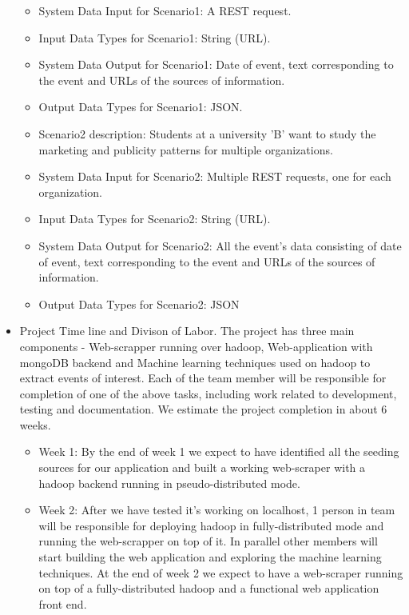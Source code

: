 \begin{itemize}
\begin{itemize}
	\item{System Data Input for Scenario1: }
	A REST request.
	\item{Input Data Types for Scenario1: }
	String (URL).
	\item{System Data Output for Scenario1: }
	Date of event, text corresponding to the event and URLs of the sources of information.
	\item{Output Data Types for Scenario1: }
	JSON.
	\item{Scenario2 description: }
	Students at a university 'B' want to study the marketing and publicity patterns for multiple organizations.
	\item{System Data Input for Scenario2: }
	Multiple REST requests, one for each organization.
	\item{Input Data Types for Scenario2: }
	String (URL).
	\item{System Data Output for Scenario2: }
	All the event's data consisting of date of event, text corresponding to the event and URLs of the sources of information.
	\item{Output Data Types for Scenario2: }
	JSON
	\end{itemize}
	
\item{ Project Time line and Divison of Labor.}
The project has three main components - Web-scrapper running over hadoop, Web-application with mongoDB backend and Machine learning techniques used on hadoop to extract events of interest. Each of the team member will be responsible for completion of one of the above tasks, including work related to development, testing and documentation. We estimate the project completion in about 6 weeks. 
	\begin{itemize}
	\item{ Week 1:}
	By the end of week 1 we expect to have identified all the seeding sources for our application and built a working web-scraper with a hadoop backend running in pseudo-distributed mode.
	
	\item{ Week 2:}
	After we have tested it's working on localhost, 1 person in team will be responsible for deploying hadoop in fully-distributed mode and running the web-scrapper on top of it. In parallel other members will start building the web application and exploring the machine learning techniques. At the end of week 2 we expect to have a web-scraper running on top of a fully-distributed hadoop and a functional web application front end. 
	

\end{itemize}
\end{itemize}
